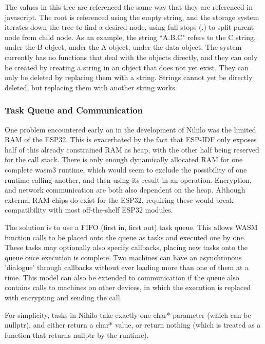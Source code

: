 \documentclass{article}
\begin{document}
The values in this tree are referenced the same way that they are referenced in javascript. The root is referenced using the empty string, and the storage system iterates down the tree to find a desired node, using full stops (.) to split parent node from child node. As an example, the string ``A.B.C" refers to the C string, under the B object, under the A object, under the data object. The system currently has no functions that deal with the objects directly, and they can only be created by creating a string in an object that does not yet exist. They can only be deleted by replacing them with a string. Strings cannot yet be directly deleted, but replacing them with another string works.

\subsubsection{Task Queue and Communication}

One problem encountered early on in the development of Nihilo was the limited RAM of the ESP32. This is exacerbated by the fact that ESP-IDF only exposes half of this already constrained RAM as heap, with the other half being reserved for the call stack. There is only enough dynamically allocated RAM for one complete wasm3 runtime, which would seem to exclude the possibility of one runtime calling another, and then using its result in an operation. Encryption, and network communication are both also dependent on the heap. Although external RAM chips do exist for the ESP32, requiring these would break compatibility with most off-the-shelf ESP32 modules.

The solution is to use a FIFO (first in, first out) task queue. This allows WASM function calls to be placed onto the queue as tasks and executed one by one. These tasks may optionally also specify callbacks, placing new tasks onto the queue once execution is complete. Two machines can have an asynchronous 'dialogue' through callbacks without ever loading more than one of them at a time. This model can also be extended to communication if the queue also contains calls to machines on other devices, in which the execution is replaced with encrypting and sending the call.

For simplicity, tasks in Nihilo take exactly one char* parameter (which can be nullptr), and either return a char* value, or return nothing (which is treated as a function that returns nullptr by the runtime).
\end{document}
